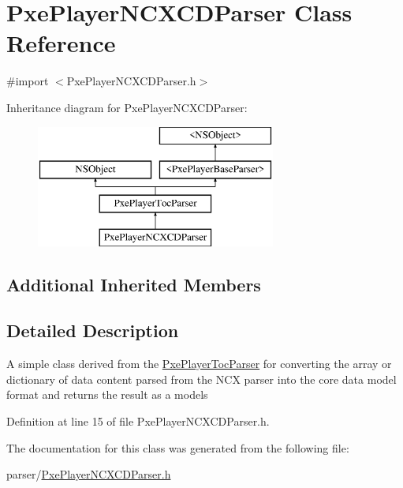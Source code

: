 \hypertarget{interface_pxe_player_n_c_x_c_d_parser}{\section{Pxe\-Player\-N\-C\-X\-C\-D\-Parser Class Reference}
\label{interface_pxe_player_n_c_x_c_d_parser}
}


{\ttfamily \#import $<$Pxe\-Player\-N\-C\-X\-C\-D\-Parser.\-h$>$}

Inheritance diagram for Pxe\-Player\-N\-C\-X\-C\-D\-Parser\-:\begin{figure}[H]
\begin{center}
\leavevmode
\includegraphics[height=4.000000cm]{interface_pxe_player_n_c_x_c_d_parser}
\end{center}
\end{figure}
\subsection*{Additional Inherited Members}


\subsection{Detailed Description}
A simple class derived from the \hyperlink{interface_pxe_player_toc_parser}{Pxe\-Player\-Toc\-Parser} for converting the array or dictionary of data content parsed from the N\-C\-X parser into the core data model format and returns the result as a models 

Definition at line 15 of file Pxe\-Player\-N\-C\-X\-C\-D\-Parser.\-h.



The documentation for this class was generated from the following file\-:\begin{DoxyCompactItemize}
\item 
parser/\hyperlink{_pxe_player_n_c_x_c_d_parser_8h}{Pxe\-Player\-N\-C\-X\-C\-D\-Parser.\-h}\end{DoxyCompactItemize}
